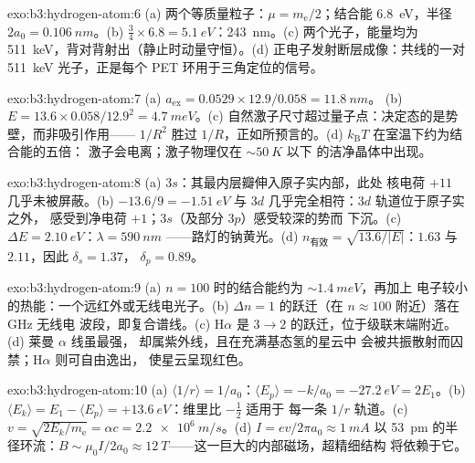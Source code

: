 \begin{solution}{exo:b3:hydrogen-atom:6}
(a) 两个等质量粒子：$\mu = m_{\text{e}}/2$；结合能
\qty{6.8}{eV}，半径 $2a_0 = \qty{0.106}{nm}$。(b) $\tfrac34
\times 6.8 = \qty{5.1}{eV}$：\qty{243}{nm}。(c) 两个光子，能量均为
\qty{511}{keV}，背对背射出（静止时动量守恒）。(d)
正电子发射断层成像：共线的一对
\qty{511}{keV} 光子，正是每个 PET 环用于三角定位的信号。
\end{solution}

\begin{solution}{exo:b3:hydrogen-atom:7}
(a) $a_{\text{ex}} = 0.0529 \times 12.9/0.058 = \qty{11.8}{nm}$。
(b) $E = 13.6 \times 0.058/12.9^2 = \qty{4.7}{meV}$。(c)
自然激子尺寸超过量子点：决定态的是势壁，而非吸引作用——
$1/R^2$ 胜过 $1/R$，正如所预言的。(d)
$k_{\text{B}}T$ 在室温下约为结合能的五倍：
激子会电离；激子物理仅在 $\sim\qty{50}{K}$ 以下
的洁净晶体中出现。
\end{solution}

\begin{solution}{exo:b3:hydrogen-atom:8}
(a) $3s$：其最内层瓣伸入原子实内部，此处
核电荷 $+11$ 几乎未被屏蔽。(b) $-13.6/9 = \qty{-1.51}{eV}$
与 $3d$ 几乎完全相符：$3d$ 轨道位于原子实之外，
感受到净电荷 $+1$；$3s$（及部分 $3p$）感受较深的势而
下沉。(c) $\Delta E = \qty{2.10}{eV}$：$\lambda = \qty{590}{nm}$
——路灯的钠黄光。(d) $n_{\text{有效}} =
\sqrt{13.6/|E|}$：$1.63$ 与 $2.11$，因此 $\delta_s = 1.37$，
$\delta_p = 0.89$。
\end{solution}

\begin{solution}{exo:b3:hydrogen-atom:9}
(a) $n = 100$ 时的结合能约为 $\sim\qty{1.4}{meV}$，再加上
电子较小的热能：一个远红外或无线电光子。(b)
$\Delta n = 1$ 的跃迁（在 $n \approx 100$ 附近）落在 GHz 无线电
波段，即复合谱线。(c) H$\alpha$ 是 $3 \to
2$ 的跃迁，位于级联末端附近。(d) 莱曼 $\alpha$ 线虽最强，
却属紫外线，且在充满基态氢的星云中
会被共振散射而囚禁；H$\alpha$ 则可自由逸出，
使星云呈现红色。
\end{solution}

\begin{solution}{exo:b3:hydrogen-atom:10}
(a) $\langle 1/r\rangle = 1/a_0$：$\langle E_p\rangle = -k/a_0 =
\qty{-27.2}{eV} = 2E_1$。(b) $\langle E_k\rangle = E_1 - \langle
E_p\rangle = +\qty{13.6}{eV}$：维里比 $-\tfrac12$ 适用于
每一条 $1/r$ 轨道。(c) $v = \sqrt{2E_k/m_{\text{e}}} = \alpha c =
\qty{2.2e6}{m/s}$。(d) $I = ev/2\pi a_0 \approx \qty{1}{mA}$
以 \qty{53}{pm} 的半径环流：$B \sim \mu_0I/2a_0 \approx
\qty{12}{T}$——这一巨大的内部磁场，超精细结构
将依赖于它。
\end{solution}

